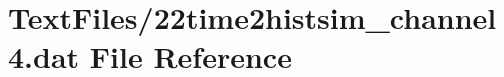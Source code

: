 \hypertarget{22time2histsim__channel4_8dat}{}\section{Text\+Files/22time2histsim\+\_\+channel4.dat File Reference}
\label{22time2histsim__channel4_8dat}
